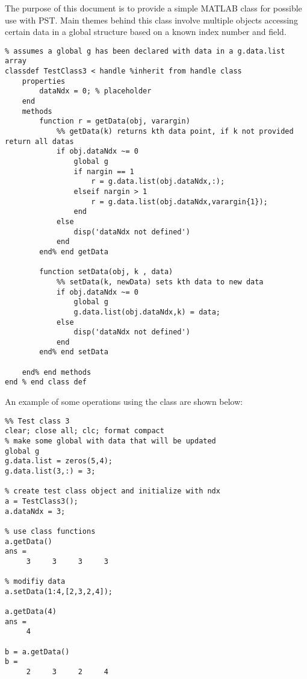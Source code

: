 \documentclass[12pt]{article}
\begin{document}
The purpose of this document is to provide a simple MATLAB class for possible use with PST.
Main themes behind this class involve multiple objects accessing certain data in a global structure based on a known index number and field.

\begin{verbatim}
% assumes a global g has been declared with data in a g.data.list array
classdef TestClass3 < handle %inherit from handle class
    properties
        dataNdx = 0; % placeholder
    end
    methods
        function r = getData(obj, varargin)
            %% getData(k) returns kth data point, if k not provided return all datas
            if obj.dataNdx ~= 0
                global g
                if nargin == 1
                    r = g.data.list(obj.dataNdx,:);
                elseif nargin > 1
                    r = g.data.list(obj.dataNdx,varargin{1});
                end
            else
                disp('dataNdx not defined')
            end
        end% end getData
        
        function setData(obj, k , data)
            %% setData(k, newData) sets kth data to new data
            if obj.dataNdx ~= 0
                global g
                g.data.list(obj.dataNdx,k) = data;
            else
                disp('dataNdx not defined')
            end
        end% end setData
        
    end% end methods
end % end class def
\end{verbatim}

\pagebreak
An example of some operations using the class are shown below:
\begin{verbatim}
%% Test class 3
clear; close all; clc; format compact
% make some global with data that will be updated
global g
g.data.list = zeros(5,4);
g.data.list(3,:) = 3;

% create test class object and initialize with ndx
a = TestClass3();
a.dataNdx = 3;

% use class functions
a.getData()
ans =
     3     3     3     3

% modifiy data
a.setData(1:4,[2,3,2,4]);

a.getData(4)
ans =
     4

b = a.getData()
b =
     2     3     2     4

\end{verbatim}
\end{document}
